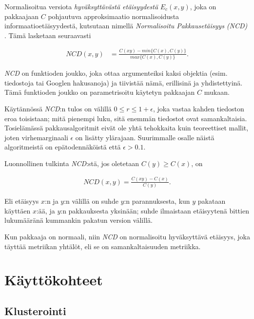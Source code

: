 \documentclass[12pt,finnish,draft,twoside]{tktltiki2}
\theoremstyle{definition}
\theoremstyle{remark}
\begin{document}
  Normalisoitua versiota \emph{hyväksyttävästä etäisyydestä} $E_c(x,y)$, joka on pakkaajaan $C$ pohjautuva approksimaatio normalisoidusta informaatioetäisyydestä, kutsutaan nimellä \emph{Normalisoitu Pakkausetäisyys (NCD)} \cite{CV05}. Tämä lasketaan seuraavasti

  \begin{align}
    NCD(x,y) &= \frac{C(xy)-min\{C(x),C(y)\}}{max\{C(x),C(y)\}}.
  \end{align}

  \emph{NCD} on funktioden joukko, joka ottaa argumenteiksi kaksi objektia (esim. tiedostoja tai Googlen hakusanoja) ja tiivistää nämä, erillisinä ja yhdistettyinä. Tämä funktioden joukko on parametrisoitu käytetyn pakkaajan $C$ mukaan.

  Käytännössä \emph{NCD}:n tulos on välillä $0 \leq r \leq 1+ \epsilon$, joka vastaa kahden tiedoston eroa toisistaan; mitä pienempi luku, sitä enemmän tiedostot ovat samankaltaisia. Tosielämässä pakkausalgoritmit eivät ole yhtä tehokkaita kuin teoreettiset mallit, joten virhemarginaali $\epsilon$ on lisätty ylärajaan. Suurimmalle osalle näistä algoritmeistä on epätodennäköistä että  $\epsilon > 0.1$.

  Luonnollinen tulkinta \emph{NCD}:stä, jos oletetaan $C(y) \geq C(x)$, on

  \begin{align}
    NCD(x,y) = \frac{C(xy)-C(x)}{C(y)}.
 \end{align}

  Eli etäisyys $x$:n ja $y$:n välillä on suhde $y$:n parannuksesta, kun $y$ pakataan käyttäen $x$:ää, ja $y$:n pakkauksesta yksinään; suhde ilmaistaan etäisyytenä bittien lukumääränä kummankin pakatun version välillä.

  Kun pakkaaja on normaali, niin \emph{NCD} on normalisoitu hyväksyttävä etäisyys, joka täyttää metriikan yhtälöt, eli se on samankaltaisuuden metriikka.



\section{Käyttökohteet} %
\label{sec:k_ytt_kohteet}
  \subsection{Klusterointi} %
  \label{sub:klusterointi}
\end{document}
